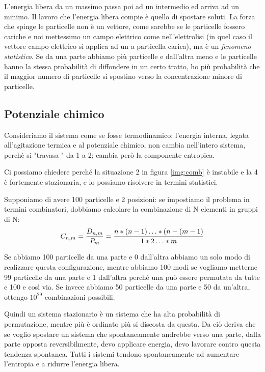 \documentclass[a4paper,12pt]{article}
\begin{document}
L'energia libera da un massimo passa poi ad un intermedio ed arriva ad un minimo. Il lavoro che l'energia libera compie è quello di spostare soluti.
La forza che spinge le particelle non è un vettore, come sarebbe se le particelle fossero cariche e noi mettessimo un campo elettrico come nell'elettrolisi (in quel caso il vettore campo elettrico si applica ad un a particella carica), ma è un \emph{fenomeno statistico}.
Se da una parte abbiamo più particelle e dall’altra meno e le particelle hanno la stessa probabilità di diffondere in un certo tratto, ho più probabilità che il maggior numero di particelle si spostino verso la concentrazione minore di particelle.

\subsection{Potenziale chimico}
Consideriamo il sistema come se fosse termodinamico:
l'energia interna, legata all'agitazione termica e al potenziale chimico, non cambia nell'intero sistema, perchè si "travasa " da 1 a 2; cambia però la componente entropica.

Ci possiamo chiedere perché la situazione 2 in figura \ref{img:comb} è instabile e la 4 è fortemente stazionaria, e lo possiamo risolvere in termini statistici.

Supponiamo di avere 100 particelle e 2 posizioni: se impostiamo il problema in termini combinatori, dobbiamo calcolare la combinazione di N elementi in gruppi di N:
\begin{equation*}
\centering
C_{n,m}=\frac{D_{n,m}}{P_{m}}=\frac{n * (n-1) \ldots *(n-(m-1) }{1*2 \ldots *m}
\end{equation*}

Se abbiamo 100 particelle da una parte e 0 dall'altra abbiamo un solo modo di realizzare questa configurazione, mentre abbiamo 100 modi se vogliamo metterne 99 particelle da una parte e 1 dall'altra perché una può essere permutata da tutte e 100 e così via.
Se invece abbiamo 50 particelle da una parte e 50 da un'altra, ottengo $10^{29}$ combinazioni possibili.

Quindi un sistema stazionario è un sistema che ha alta probabilità di permutazione, mentre più è ordinato più si discosta da questa. Da ciò deriva che se voglio spostare un sistema che spontaneamente andrebbe verso una parte, dalla parte opposta reversibilmente, devo applicare energia, devo lavorare contro questa tendenza spontanea.
Tutti i sistemi tendono spontaneamente ad aumentare l'entropia e a ridurre l'energia libera.
\end{document}
